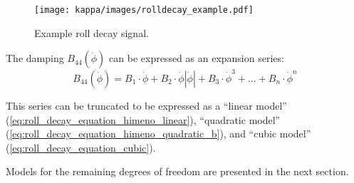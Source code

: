 \begin{figure}[H]
    \centering
    \texttt{[image: kappa/images/rolldecay\_example.pdf]}
    \caption{Example roll decay signal.}
    \label{fig:rolldecay}
\end{figure}

\noindent The damping $B_{44}\left(\dot{\phi}\right)$ can be expressed as an expansion series:  
\begin{equation}
    B_{44}\left(\dot{\phi}\right) = B_1\cdot\dot{\phi} + B_2\cdot\dot{\phi}\left|\dot{\phi}\right| + B_3\cdot\dot{\phi}^3 + ... + B_n\cdot\dot{\phi}^n
\end{equation}
 
\noindent This series can be truncated to be expressed as a ``linear model'' (\autoref{eq:roll_decay_equation_himeno_linear}), ``quadratic model'' (\autoref{eq:roll_decay_equation_himeno_quadratic_b}), and ``cubic model'' (\autoref{eq:roll_decay_equation_cubic}).




Models for the remaining degrees of freedom are presented in the next section.
\vspace{-0.2cm}


